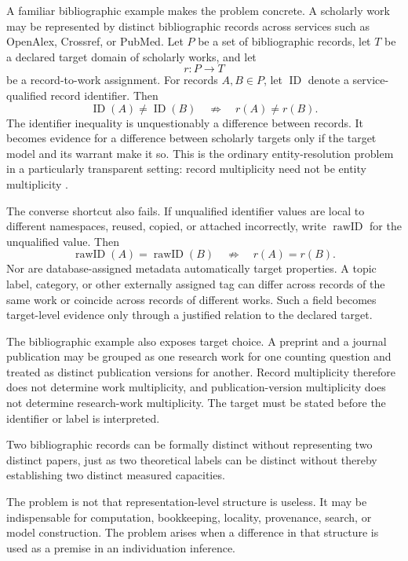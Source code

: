 \documentclass[11pt]{article}
\begin{document}
A familiar bibliographic example makes the problem concrete. A scholarly work may be represented by distinct bibliographic records across services such as OpenAlex, Crossref, or PubMed. Let \(P\) be a set of bibliographic records, let \(T\) be a declared target domain of scholarly works, and let
\[
r:P\to T
\]
be a record-to-work assignment. For records \(A,B\in P\), let \(\operatorname{ID}\) denote a service-qualified record identifier. Then
\[
\operatorname{ID}(A)\neq\operatorname{ID}(B)
\quad\not\Rightarrow\quad
r(A)\neq r(B).
\]
The identifier inequality is unquestionably a difference between records. It becomes evidence for a difference between scholarly targets only if the target model and its warrant make it so. This is the ordinary entity-resolution problem in a particularly transparent setting: record multiplicity need not be entity multiplicity \citep{AleshinGuendelSteorts2024EntityResolution}.

The converse shortcut also fails. If unqualified identifier values are local to different namespaces, reused, copied, or attached incorrectly, write \(\operatorname{rawID}\) for the unqualified value. Then
\[
\operatorname{rawID}(A)=\operatorname{rawID}(B)
\quad\not\Rightarrow\quad
r(A)=r(B).
\]
Nor are database-assigned metadata automatically target properties. A topic label, category, or other externally assigned tag can differ across records of the same work or coincide across records of different works. Such a field becomes target-level evidence only through a justified relation to the declared target.

The bibliographic example also exposes target choice. A preprint and a journal publication may be grouped as one research work for one counting question and treated as distinct publication versions for another. Record multiplicity therefore does not determine work multiplicity, and publication-version multiplicity does not determine research-work multiplicity. The target must be stated before the identifier or label is interpreted.

Two bibliographic records can be formally distinct without representing two distinct papers, just as two theoretical labels can be distinct without thereby establishing two distinct measured capacities.

The problem is not that representation-level structure is useless. It may be indispensable for computation, bookkeeping, locality, provenance, search, or model construction. The problem arises when a difference in that structure is used as a premise in an individuation inference.
\end{document}
